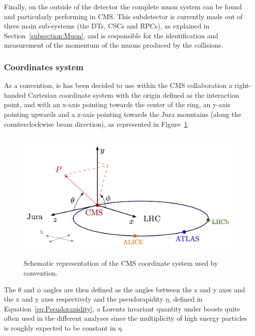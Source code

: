 \documentclass[a4paper, 10pt, openright]{report}
\begin{document}
Finally, on the outside of the detector the complete muon system can be found and particularly performing in \ac{CMS}. This subdetector is currently made out of three main sub-systems (the \acp{DT}, \acp{CSC} and \acp{RPC}), as explained in Section~\ref{subsection:Muon}, and is responsible for the identification and measurement of the momentum of the muons produced by the collisions.

\subsubsection*{Coordinates system}

As a convention, is has been decided to use within the \ac{CMS} collaboration a right-handed Cartesian coordinate system with the origin defined as the interaction point, and with an x-axis pointing towards the center of the ring, an y-axis pointing upwards and a z-axis pointing towards the Jura mountains (along the counterclockwise beam direction), as represented in Figure~\ref{fig:CMSAxis}. 

\begin{figure}[htbp]
\begin{center}
\includegraphics[width=12.2cm, height=6.5cm]{figs/CMSAxis.png}
\caption{Schematic representation of the \ac{CMS} coordinate system used by convention.}
\label{fig:CMSAxis}
\end{center}
\end{figure}

The $\theta$ and $\phi$ angles are then defined as the angles between the z and y axes and the x and y axes respectively and the pseudorapidity $\eta$, defined in Equation~\ref{eq:Pseudorapidity}, a Lorentz invariant quantity under boosts quite often used in the different analyses since the multiplicity of high energy particles is roughly expected to be constant in $\eta$.
\end{document}
